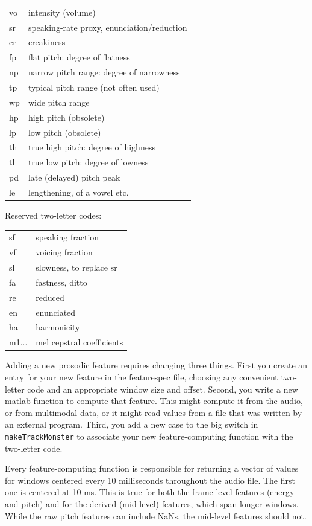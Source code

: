 \documentclass[11pt]{article}
\begin{document}
\begin{tabular}{ll}
  vo  & intensity (volume) \\
  sr  & speaking-rate proxy, enunciation/reduction \\
  cr  & creakiness \\
  fp  & flat pitch: degree of flatness \\
  np  & narrow pitch range: degree of narrowness \\
  tp  & typical pitch range (not often used)\\
  wp  & wide pitch range  \\
  hp  & high pitch (obsolete) \\ 
  lp  & low pitch (obsolete) \\
  th  & true high pitch: degree of highness  \\ 
  tl  & true low pitch: degree of lowness \\
  pd  & late (delayed) pitch peak \\
  le  & lengthening, of a vowel etc. \\
\end{tabular}

Reserved two-letter codes: 

\begin{tabular}{ll}  
  sf      & speaking fraction \\
  vf      & voicing fraction \\
  sl      & slowness, to replace sr \\
  fa      & fastness, ditto\\
  re      & reduced \\
  en      & enunciated \\
  ha      & harmonicity \\
  m1...   & mel cepstral coefficients
\end{tabular}

Adding a new prosodic feature requires changing three things.  First
you create an entry for your new feature in the featurespec file,
choosing any convenient two-letter code and an appropriate window size
and offset.  Second, you write a new matlab function to compute that
feature.  This might compute it from the audio, or from multimodal
data, or it might read values from a file that was written by an
external program.  Third, you add a new case to the big switch in {\tt
  makeTrackMonster} to associate your new feature-computing function
with the two-letter code.

Every feature-computing function is responsible for returning a vector
of values for windows centered every 10 milliseconds throughout the
audio file.  The first one is centered at 10 ms.  This is true for
both the frame-level features (energy and pitch) and for the derived
(mid-level) features, which span longer windows.  While the raw pitch
features can include NaNs, the mid-level features should not.
\end{document}
